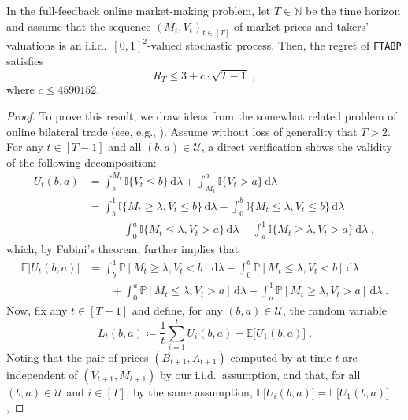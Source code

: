 \documentclass[final,12pt]{colt2025}
\newcommand{\cU}{\mathcal{U}}
\newcommand{\E}{\mathbb{E}}
\newcommand{\N}{\mathbb{N}}
\newcommand{\Pb}{\mathbb{P}}
\newcommand{\bsb}[1]{\bigl[#1\bigr]}
\newcommand{\one}[1]{\mathbb{I}\{#1\}}
\newcommand{\dif}{\,\mathrm{d}}
\newcommand{\Util}{U}
\newcommand{\ftbp}{\texttt{FTABP}}
\newcommand{\nP}{M}
\newcommand{\nZ}{V}
\newcommand{\nB}{B}
\newcommand{\nb}{b}
\newcommand{\nS}{A}
\newcommand{\ns}{a}
\begin{document}
\begin{theorem}
\label{s:upper-bound-full}
    In the full-feedback online market-making problem, 
    let $T \in \N$ be the time horizon and assume that the sequence $(\nP_t,\nZ_t)_{t \in [T]}$ of market prices and takers' valuations is an i.i.d.\ $[0,1]^2$-valued stochastic process.
    Then, the regret of \ftbp{} satisfies
    \[
        R_T
    \le
        3 + c \cdot \sqrt{T-1} \;,
    \]
    where $c \le 4590152$.
\end{theorem}

\begin{proof}
    To prove this result, we draw ideas from the somewhat related problem of online bilateral trade (see, e.g., \cite[Theorem 1]{cesa2024bilateral}). 
    Assume without loss of generality that $T > 2$.
    For any $t \in [T - 1]$ and all $(\nb,\ns)\in \cU$, a direct verification shows the validity of the following decomposition:
    \begin{align*}
        \Util_t(\nb, \ns)
    &= 
        \int_{\nb}^{\nP_t} \one{ \nZ_t \le \nb } \dif\lambda
            + \int_{\nP_t}^{\ns} \mathbb{I}\{ \nZ_t > \ns \} \dif \lambda \\
    &=
        \int_\nb^1 \one{ \nP_t \ge \lambda, \nZ_t \le \nb } \dif\lambda
        - \int_0^\nb \one{ \nP_t \le \lambda, \nZ_t \le \nb } \dif\lambda
    \\ & \qquad
        + \int_0^\ns \one{ \nP_t \le \lambda, \nZ_t > \ns } \dif\lambda
        - \int_\ns^1 \one{ \nP_t \ge \lambda, \nZ_t > \ns } \dif\lambda \;,
    \end{align*}
    which, by Fubini's theorem, further implies that
    \begin{align*}
        \E\bsb{ \Util_t(\nb, \ns) }
    &=
        \int_\nb^1 \Pb[ \nP_t \ge \lambda, \nZ_t < \nb ] \dif\lambda
        - \int_0^\nb \Pb[ \nP_t \le \lambda, \nZ_t < \nb ] \dif\lambda \\
    & \qquad + \int_0^\ns \Pb[ \nP_t \le \lambda, \nZ_t > \ns ] \dif\lambda
        - \int_\ns^1 \Pb[ \nP_t \ge \lambda, \nZ_t > \ns ] \dif\lambda \;.
    \end{align*}
    Now, fix any $t \in [T - 1]$ and define, for any $(\nb, \ns) \in \cU$, the random variable
    \[
        L_t(\nb, \ns) \coloneq \frac{1}{t} \sum_{i=1}^t \Util_i(\nb, \ns) - \E \bsb{ \Util_1( \nb, \ns ) } \;.
    \]
    Noting that the pair of prices $(\nB_{t+1}, \nS_{t+1})$  computed by  at time $t$ are independent of $(\nZ_{t+1}, \nP_{t+1})$ by our i.i.d.\ assumption, 
    and that, for all $(\nb,\ns) \in \cU$ and $i\in[T]$, by the same assumption, $\E\bsb{ \Util_{i}(\nb,\ns) } = \E\bsb{ \Util_{1}(\nb,\ns) }$,

\end{proof}
\end{document}
